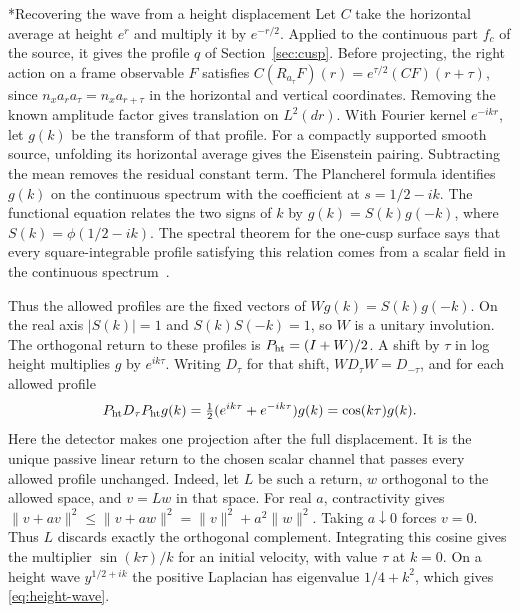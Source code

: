 \documentclass[11pt,letterpaper]{article}
\makeatletter
\renewcommand\subsection{\@startsection{subsection}{2}{\z@}{-2.0ex plus -.3ex}{.75ex}{\normalfont\normalsize\itshape}}
\numberwithin{equation}{section}
\makeatother
\begin{document}
\subsection*{Recovering the wave from a height displacement}\label{app:height-wave}
Let $C$ take the horizontal average at height $e^r$ and multiply it by $e^{-r/2}$. Applied to the continuous part $f_c$ of the source, it gives the profile $q$ of Section~\ref{sec:cusp}. Before projecting, the right action on a frame observable $F$ satisfies $C(R_{a_\tau}F)(r)=e^{\tau/2}(CF)(r+\tau)$, since $n_xa_ra_\tau=n_xa_{r+\tau}$ in the horizontal and vertical coordinates. Removing the known amplitude factor gives translation on $L^2(dr)$. With Fourier kernel $e^{-ikr}$, let $g(k)$ be the transform of that profile. For a compactly supported smooth source, unfolding its horizontal average gives the Eisenstein pairing. Subtracting the mean removes the residual constant term. The Plancherel formula identifies $g(k)$ on the continuous spectrum with the coefficient at $s=1/2-ik$. The functional equation relates the two signs of $k$ by $g(k)=S(k)g(-k)$, where $S(k)=\phi(1/2-ik)$. The spectral theorem for the one-cusp surface says that every square-integrable profile satisfying this relation comes from a scalar field in the continuous spectrum~\cite[\S\S2.5--2.6]{muellerspec}.

Thus the allowed profiles are the fixed vectors of $Wg(k)=S(k)g(-k)$. On the real axis $|S(k)|=1$ and $S(k)S(-k)=1$, so $W$ is a unitary involution. The orthogonal return to these profiles is $P_{\rm ht}=(I+W)/2$. A shift by $\tau$ in log height multiplies $g$ by $e^{ik\tau}$. Writing $D_\tau$ for that shift, $WD_\tau W=D_{-\tau}$, and for each allowed profile
\[
 P_{\rm ht}D_\tau P_{\rm ht}g(k)
   =\tfrac12(e^{ik\tau}+e^{-ik\tau})g(k)=\cos(k\tau)g(k).
\]
Here the detector makes one projection after the full displacement. It is the unique passive linear return to the chosen scalar channel that passes every allowed profile unchanged. Indeed, let $L$ be such a return, $w$ orthogonal to the allowed space, and $v=Lw$ in that space. For real $a$, contractivity gives $\|v+av\|^2\le\|v+aw\|^2=\|v\|^2+a^2\|w\|^2$. Taking $a\downarrow0$ forces $v=0$. Thus $L$ discards exactly the orthogonal complement. Integrating this cosine gives the multiplier $\sin(k\tau)/k$ for an initial velocity, with value $\tau$ at $k=0$. On a height wave $y^{1/2+ik}$ the positive Laplacian has eigenvalue $1/4+k^2$, which gives \eqref{eq:height-wave}.
\end{document}
